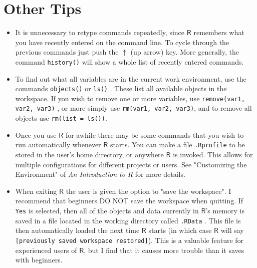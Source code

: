 \section{Other Tips}
\label{sec-2-6}

\begin{itemize}
\item
It is unnecessary to retype commands repeatedly, since \(\mathsf{R}\)
remembers what you have recently entered on the command line.
To cycle through the previous commands just push the \(\uparrow\) (up arrow) key.
More generally, the command \texttt{history()}
 will show a whole list of recently
entered commands.
\item To find out what all variables are in the current work environment,
use the commands \texttt{objects()}  or
\texttt{ls()} . These list all available objects in
the workspace. If you wish to remove one or more variables, use
\texttt{remove(var1, var2, var3)} , or more
simply use \texttt{rm(var1, var2, var3)}, and to remove all objects use
\texttt{rm(list = ls())}.
\item Once you use \(\mathsf{R}\) for awhile there may be some commands
that you wish to run automatically whenever \(\mathsf{R}\)
starts.
You can make a file
\texttt{.Rprofile}  to be
stored in the user's home directory, or anywhere \(\mathsf{R}\) is
invoked. This allows for multiple configurations for different
projects or users. See "Customizing the Environment" of \emph{An
Introduction to R} for more details.
\item When exiting \(\mathsf{R}\) the user is given the option to "save
the workspace". I recommend that beginners DO NOT save the
workspace when quitting. If \texttt{Yes} is selected, then all of the
objects and data currently in \(\mathsf{R}\)'s memory is saved in a
file located in the working directory called
\texttt{.RData} . This file is then
automatically loaded the next time \(\mathsf{R}\) starts (in which
case \(\mathsf{R}\) will say \texttt{[previously saved workspace
  restored]}). This is a valuable feature for experienced users of
\(\mathsf{R}\), but I find that it causes more trouble than it saves
with beginners.
\end{itemize}
